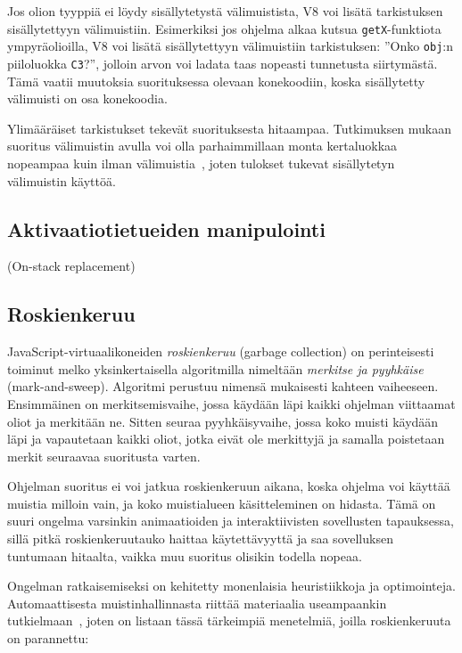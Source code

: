 Jos olion tyyppiä ei löydy sisällytetystä välimuistista, V8 voi lisätä tarkistuksen sisällytettyyn välimuistiin. Esimerkiksi jos ohjelma alkaa kutsua \texttt{getX}-funktiota ympyräolioilla, V8 voi lisätä sisällytettyyn välimuistiin tarkistuksen: ''Onko \texttt{obj}:n piiloluokka \texttt{C3}?'', jolloin arvon voi ladata taas nopeasti tunnetusta siirtymästä. Tämä vaatii muutoksia suorituksessa olevaan konekoodiin, koska sisällytetty välimuisti on osa konekoodia.

Ylimääräiset tarkistukset tekevät suorituksesta hitaampaa. Tutkimuksen mukaan suoritus välimuistin avulla voi olla parhaimmillaan monta kertaluokkaa nopeampaa kuin ilman välimuistia~\cite[s.~498]{Ahn2014}, joten  tulokset tukevat sisällytetyn välimuistin käyttöä.

\subsection{Aktivaatiotietueiden manipulointi}

(On-stack replacement)

\subsection{Roskienkeruu}

JavaScript-virtuaalikoneiden \textit{roskienkeruu} (garbage collection) on perinteisesti toiminut melko yksinkertaisella algoritmilla nimeltään \textit{merkitse ja pyyhkäise} (mark-and-sweep). Algoritmi perustuu nimensä mukaisesti kahteen vaiheeseen. Ensimmäinen on merkitsemisvaihe, jossa käydään läpi kaikki ohjelman viittaamat oliot ja merkitään ne. Sitten seuraa pyyhkäisyvaihe, jossa koko muisti käydään läpi ja vapautetaan kaikki oliot, jotka eivät ole merkittyjä ja samalla poistetaan merkit seuraavaa suoritusta varten.

Ohjelman suoritus ei voi jatkua roskienkeruun aikana, koska ohjelma voi käyttää muistia milloin vain, ja koko muistialueen käsitteleminen on hidasta. Tämä on suuri ongelma varsinkin animaatioiden ja interaktiivisten sovellusten tapauksessa, sillä pitkä roskienkeruutauko haittaa käytettävyyttä ja saa sovelluksen tuntumaan hitaalta, vaikka muu suoritus olisikin todella nopeaa.

Ongelman ratkaisemiseksi on kehitetty monenlaisia heuristiikkoja ja optimointeja. Automaattisesta muistinhallinnasta riittää materiaalia useampaankin tutkielmaan~\cite{gcbib}, joten on listaan tässä tärkeimpiä menetelmiä, joilla roskienkeruuta on parannettu:

